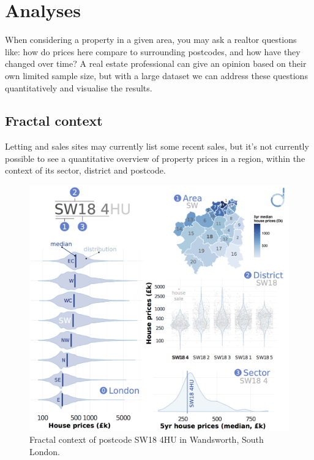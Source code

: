 \documentclass[
10pt, %
a4paper, %
oneside, %
headinclude,footinclude, %
BCOR5mm, %
]{scrartcl}
\begin{document}



\vspace{-1em}
\section*{Analyses}

When considering a property in a given area, you may ask a realtor
questions like: how do prices here compare to surrounding postcodes, and
how have they changed over time? A real estate professional can
give an opinion based on their own limited sample size, but with a
large dataset we can address these questions quantitatively and
visualise the results.

\subsection*{Fractal context}

Letting and sales sites may currently list some recent sales, but it's
not currently possible to see a quantitative overview of property
prices in a region, within the context of its sector, district and
postcode.

\begin{figure}
\vspace{.5em}
\centering
\includegraphics[width=.43\textwidth]{Figures/fractal.png}
\caption{ Fractal context of postcode SW18 4HU in Wandsworth, South London.}
\end{figure}
\end{document}
